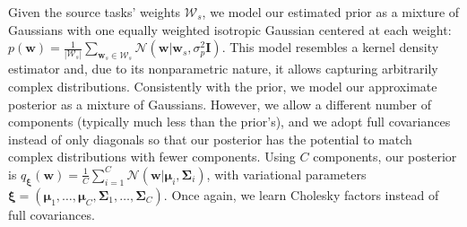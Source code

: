 \documentclass{article}
\newcommand{\abs}[1]{\left\lvert #1 \right\rvert}
\begin{document}
Given the source tasks' weights $\mathcal{W}_s$, we model our estimated prior as a mixture of Gaussians with one equally weighted isotropic Gaussian centered at each weight: $p(\bm{w}) = \frac{1}{\abs{\mathcal{W}_s}}\sum_{\bm{w}_s \in \mathcal{W}_s}\mathcal{N}(\bm{w}|\bm{w}_s,\sigma_p^2\bm{I})$. This model resembles a kernel density estimator \cite{scott2015multivariate} and, due to its nonparametric nature, it allows capturing arbitrarily complex distributions. Consistently with the prior, we model our approximate posterior as a mixture of Gaussians. However, we allow a different number of components  (typically much less than the prior's), and we adopt full covariances instead of only diagonals so that our posterior has the potential to match complex distributions with fewer components. Using $C$ components, our posterior is $q_{\bm{\xi}}(\bm{w}) = \frac{1}{C}\sum_{i=1}^C\mathcal{N}(\bm{w}|\bm{\mu}_i,\bm{\Sigma}_i)$, with variational parameters $\bm{\xi} = (\bm{\mu}_1,\dots,\bm{\mu}_C,\bm{\Sigma}_1,\dots,\bm{\Sigma}_C)$. Once again, we learn Cholesky factors instead of full covariances.
\end{document}

